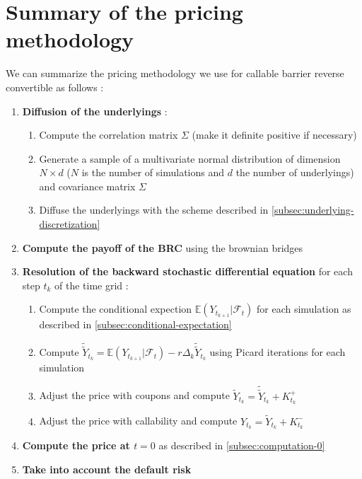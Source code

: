 \documentclass[a4paper,11pt,english]{book}
\begin{document}
\section{Summary of the pricing methodology}
\label{sec:summary}
We can summarize the pricing methodology we use for callable barrier reverse convertible as follows :
\begin{enumerate}
    \item \textbf{Diffusion of the underlyings} :
    \begin{enumerate}
        \item Compute the correlation matrix $\Sigma$ (make it definite positive if necessary)
        \item Generate a sample of a multivariate normal distribution of dimension $N\times d$ ($N$ is the number of simulations and $d$ the number of underlyings) and covariance matrix  $\Sigma$ 
        \item Diffuse the underlyings with the scheme described in \ref{subsec:underlying-discretization}
    \end{enumerate}
    \item \textbf{Compute the payoff of the BRC} using the brownian bridges
    \item \textbf{Resolution of the backward stochastic differential equation} for each step $t_{k}$ of the time grid :
    \begin{enumerate}
        \item Compute the conditional expection $\mathbb{E}(Y_{t_{k+1}}|\mathcal{F}_{t})$ for each simulation as described in \ref{subsec:conditional-expectation}
        \item Compute $\widetilde{\widetilde{Y}}_{t_{k}}=\mathbb{E}(Y_{t_{k+1}}|\mathcal{F}_{t}) -r\Delta_{k}\widetilde{\widetilde{Y}}_{t_{k}}$ using Picard iterations for each simulation
        \item Adjust the price with coupons and compute $\widetilde{Y}_{t_{k}} = \widetilde{\widetilde{Y}}_{t_{k}} + K_{t_{k}}^{+}$
        \item Adjust the price with callability and compute $Y_{t_{k}} = \widetilde{Y}_{t_{k}} + K_{t_{k}}^{-}$
    \end{enumerate}
    \item \textbf{Compute the price at $t=0$} as described in \ref{subsec:computation-0}
    \item \textbf{Take into account the default risk}
\end{enumerate}
\end{document}
